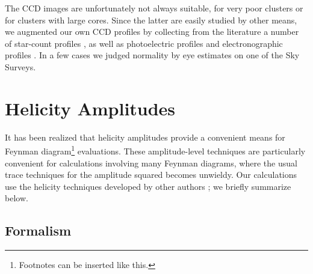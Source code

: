 \documentclass[manuscript]{aastex}
\begin{document}
The CCD images are unfortunately not always suitable, for very poor
clusters or for clusters with large cores.  Since the latter are easily
studied by other means, we augmented our own CCD profiles by collecting
from the literature a number of star-count profiles 
\citep{kin68,pet76,har84,ort85}, as well as photoelectric profiles 
\citep{kin66,kin75} and electronographic profiles \citep{kro84}.
In a few cases we judged normality by eye estimates on one of the Sky
Surveys.




\section{Helicity Amplitudes}

It has been realized that helicity amplitudes provide a convenient means
for Feynman diagram\footnote{Footnotes can be inserted like this.}
evaluations.  These amplitude-level techniques
are particularly convenient for calculations involving many Feynman
diagrams, where the usual trace techniques for the amplitude
squared becomes unwieldy.  Our calculations use the helicity techniques
developed by other authors \cite[]{hag86}; we briefly summarize below.

\subsection{Formalism} \label{bozomath}

\end{document}
